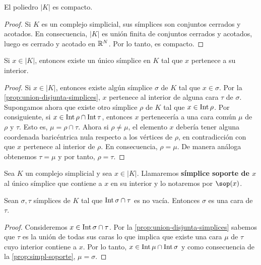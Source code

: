 \begin{proposicion}
	El poliedro $|K|$ es compacto.
\end{proposicion}
\begin{proof}
	Si $K$ es un complejo simplicial, sus símplices son conjuntos cerrados y
	acotados. En consecuencia, $|K|$ es unión finita de conjuntos cerrados y
	acotados, luego es cerrado y acotado en $\mathbb{R}^{N}$. Por lo tanto, es compacto.
\end{proof}
\begin{proposicion}
	\label{prop:simpl-soporte} Si $x \in |K|$, entonces existe un único símplice
	en $K$ tal que $x$ pertenece a su interior.
\end{proposicion}
\begin{proof}
	Si $x \in |K|$, entonces existe algún símplice $\sigma$ de $K$ tal que
	$x \in \sigma$. Por la \autoref{prop:union-disjunta-simplices}, $x$ pertenece
	al interior de alguna cara $\tau$ de $\sigma$. Supongamos ahora que existe otro
	símplice $\rho$ de $K$ tal que $x \in \operatorname{Int} \rho$. Por consiguiente, si $x
	\in \operatorname{Int} \rho \cap \operatorname{Int} \tau$, entonces $x$ pertenecería a una cara
	común $\mu$ de $\rho$ y $\tau$. Esto es, $\mu = \rho \cap \tau$. Ahora si $\rho
	\neq \mu$, el elemento $x$ debería tener alguna coordenada baricéntrica nula
	respecto a los vértices de $\rho$, en contradicción con que $x$ pertenece al interior
	de $\rho$. En consecuencia, $\rho = \mu$. De manera análoga obtenemos
	$\tau = \mu$ y por tanto, $\rho = \tau$.
\end{proof}
\begin{definicion}
	Sea $K$ un complejo simplicial y sea $x \in |K|$. Llamaremos \textbf{símplice
		soporte de $x$} al único símplice que contiene a $x$ en su interior y lo notaremos
	por $\sop(x)$.
\end{definicion}
\begin{corolario}
	\label{cor:simpl-soporte} Sean $\sigma, \tau$ símplices de $K$ tal que $\operatorname{Int}
	\sigma \cap \tau$ es no vacía. Entonces $\sigma$ es una cara de $\tau$.
\end{corolario}
\begin{proof}
	Consideremos $x \in \operatorname{Int} \sigma \cap \tau$. Por la
	\autoref{prop:union-disjunta-simplices} sabemos que $\tau$ es la unión de
	todas sus caras lo que implica que existe una cara $\mu$ de $\tau$ cuyo
	interior contiene a $x$. Por lo tanto,
	$x \in \operatorname{Int} \mu \cap \operatorname{Int} \sigma$ y como consecuencia de la
	\autoref{prop:simpl-soporte}, $\mu = \sigma$.
\end{proof}
